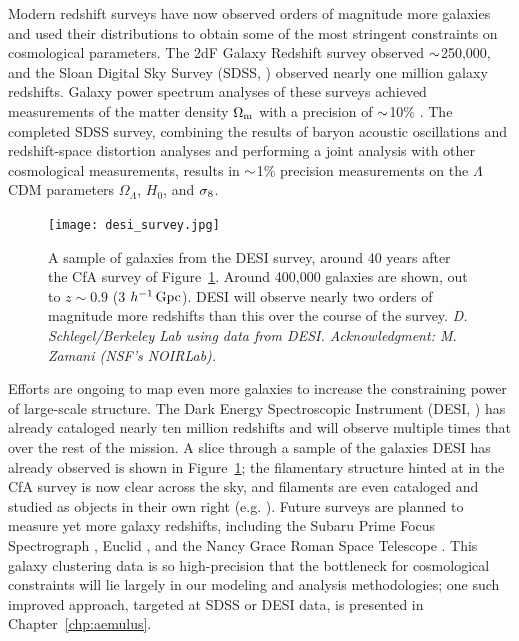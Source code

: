 Modern redshift surveys have now observed orders of magnitude more galaxies and used their distributions to obtain some of the most stringent constraints on cosmological parameters.
The 2dF Galaxy Redshift survey \citep{Colless2001} observed $\mathord{\sim}$250,000, and the Sloan Digital Sky Survey (SDSS, \citealt{York2000}) observed nearly one million galaxy redshifts.
Galaxy power spectrum analyses of these surveys achieved measurements of the matter density ${\Omega_\mathrm{m}}$ with a precision of $\mathord{\sim}$10\% \citep{cole_2df_2005, tegmark_cosmological_2006}.
The completed SDSS survey, combining the results of baryon acoustic oscillations and redshift-space distortion analyses and performing a joint analysis with other cosmological measurements, results in $\mathord{\sim}$1\% precision measurements on the $\Lambda$CDM parameters $\Omega_\Lambda$, $H_0$, and $\sigma_\mathrm{8}$.

\begin{figure}
    \centering
    \texttt{[image: desi\_survey.jpg]}
    \caption{A sample of galaxies from the DESI survey, around 40 years after the CfA survey of Figure~\ref{fig:desi_survey}. Around 400,000 galaxies are shown, out to $z \sim 0.9$ (3 $h^{-1}\,\mathrm{Gpc}$). DESI will observe nearly two orders of magnitude more redshifts than this over the course of the survey. \emph{D. Schlegel/Berkeley Lab using data from DESI. Acknowledgment: M. Zamani (NSF's NOIRLab).}}
    \label{fig:desi_survey}
\end{figure}

Efforts are ongoing to map even more galaxies to increase the constraining power of large-scale structure.
The Dark Energy Spectroscopic Instrument (DESI, \citealt{Aghamousa2016}) has already cataloged nearly ten million redshifts and will observe multiple times that over the rest of the mission.
A slice through a sample of the galaxies DESI has already observed is shown in Figure~\ref{fig:desi_survey}; the filamentary structure hinted at in the CfA survey is now clear across the sky, and filaments are even cataloged and studied as objects in their own right (e.g. \citealt{tempel_detecting_2014}).
Future surveys are planned to measure yet more galaxy redshifts, including the Subaru Prime Focus Spectrograph \citep{takada_extragalactic_2014}, Euclid \citep{Laureijs2011}, and the Nancy Grace Roman Space Telescope \citep{Green2012}.
This galaxy clustering data is so high-precision that the bottleneck for cosmological constraints will lie largely in our modeling and analysis methodologies; one such improved approach, targeted at SDSS or DESI data, is presented in Chapter~\ref{chp:aemulus}.

